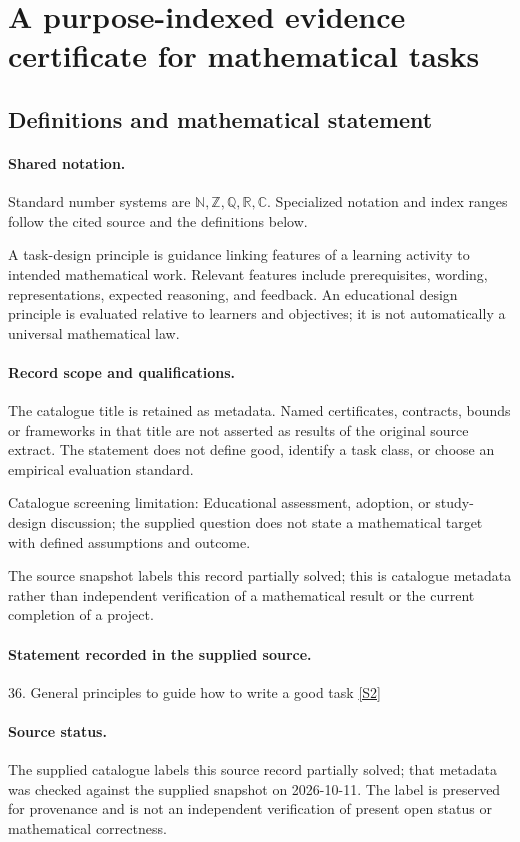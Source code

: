 \documentclass[11pt]{article}
\newcommand{\sref}[2]{\hyperlink{source:#1:#2}{[S#2]}}
\begin{document}
\section{A purpose-indexed evidence certificate for mathematical tasks}\label{statement}

\subsection{Definitions and mathematical statement}

\paragraph{Shared notation.}Standard number systems are $\mathbb N,\mathbb Z,\mathbb Q,\mathbb R,\mathbb C$. Specialized notation and index ranges follow the cited source and the definitions below.


A task-design principle is guidance linking features of a learning activity to intended mathematical work. Relevant features include prerequisites, wording, representations, expected reasoning, and feedback. An educational design principle is evaluated relative to learners and objectives; it is not automatically a universal mathematical law.
\paragraph{Record scope and qualifications.}
The catalogue title is retained as metadata. Named certificates, contracts, bounds or frameworks in that title are not asserted as results of the original source extract.
The statement does not define good, identify a task class, or choose an empirical evaluation standard.

Catalogue screening limitation: Educational assessment, adoption, or study-design discussion; the supplied question does not state a mathematical target with defined assumptions and outcome.

The source snapshot labels this record partially solved; this is catalogue metadata rather than independent verification of a mathematical result or the current completion of a project.
\paragraph{Statement recorded in the supplied source.}
36. General principles to guide how to write a good task \sref{statement}{2}
\paragraph{Source status.}
The supplied catalogue labels this source record partially solved; that metadata was checked against the supplied snapshot on 2026-10-11. The label is preserved for provenance and is not an independent verification of present open status or mathematical correctness.
\end{document}
